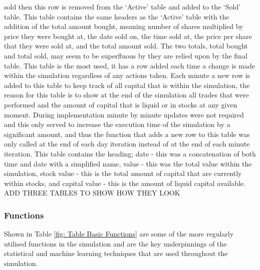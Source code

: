 \documentclass[conference]{IEEEtran}
\begin{document}
sold then this row is removed from the `Active' table and added to the `Sold' table. This table contains the same headers as the `Active' table with the addition of the total amount bought, meaning number of shares multiplied by price they were bought at, the date sold on, the time sold at, the price per share that they were sold at, and the total amount sold. The two totals, total bought and total sold, may seem to be superfluous by they are relied upon by the final table. This table is the most used, it has a row added each time a change is made within the simulation regardless of any actions taken. Each minute a new row is added to this table to keep track of all capital that is within the simulation, the reason for this table is to show at the end of the simulation all trades that were performed and the amount of capital that is liquid or in stocks at any given moment. During implementation minute by minute updates were not required and this only served to increase the execution time of the simulation by a significant amount, and thus the function that adds a new row to this table was only called at the end of each day iteration instead of at the end of each minute iteration. This table contains the heading; date - this was a concatenation of both time and date with a simplified name, value - this was the total value within the simulation, stock value - this is the total amount of capital that are currently within stocks, and capital value - this is the amount of liquid capital available. \\

ADD THREE TABLES TO SHOW HOW THEY LOOK\\
\fi

\subsubsection{Functions}

Shown in Table \ref{fig: Table Basic Functions} are some of the more regularly utilised functions in the simulation and are the key underpinnings of the statistical and machine learning techniques that are used throughout the simulation. \\
\end{document}
